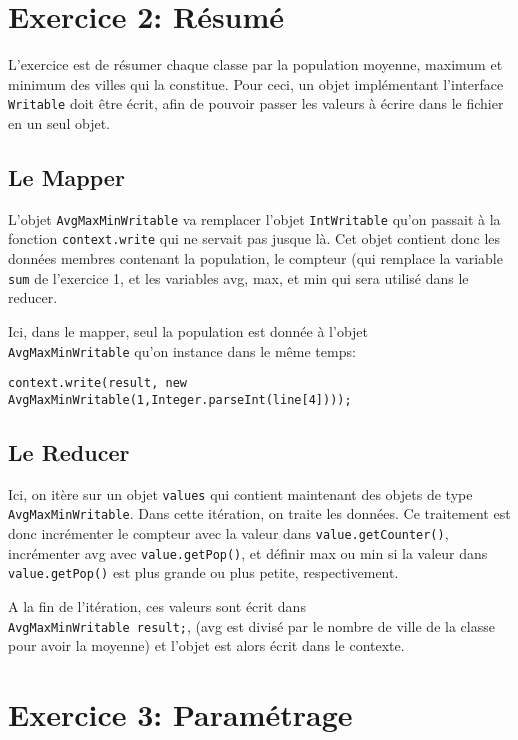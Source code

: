\documentclass[a4paper]{article}
\begin{document}
\section{Exercice 2: Résumé}

L'exercice est de résumer chaque classe par la population moyenne, maximum et minimum des villes qui la constitue. Pour ceci, un objet implémentant l'interface \verb?Writable? doit être écrit, afin de pouvoir passer les valeurs à écrire dans le fichier en un seul objet.


\subsection{Le Mapper}

L'objet \verb?AvgMaxMinWritable? va remplacer l'objet \verb?IntWritable? qu'on passait à la fonction \verb?context.write? qui ne servait pas jusque là. Cet objet contient donc les données membres contenant la population, le compteur (qui remplace la variable \verb?sum? de l'exercice 1, et les variables avg, max, et min qui sera utilisé dans le reducer.

Ici, dans le mapper, seul la population est donnée à l'objet \\ \verb?AvgMaxMinWritable? qu'on instance dans le même temps:
\begin{lstlisting}
context.write(result, new AvgMaxMinWritable(1,Integer.parseInt(line[4])));
\end{lstlisting}

\subsection{Le Reducer}

Ici, on itère sur un objet \verb?values? qui contient maintenant des objets de type \verb?AvgMaxMinWritable?. Dans cette itération, on traite les données. Ce traitement est donc incrémenter le compteur avec la valeur dans \verb?value.getCounter()?, incrémenter avg avec \verb?value.getPop()?, et définir max ou min si la valeur dans \verb?value.getPop()? est plus grande ou plus petite, respectivement.

A la fin de l'itération, ces valeurs sont écrit dans\\ \verb?AvgMaxMinWritable result;?, (avg est divisé par le nombre de ville de la classe pour avoir la moyenne) et l'objet est alors écrit dans le contexte.

\section{Exercice 3: Paramétrage}
\end{document}
